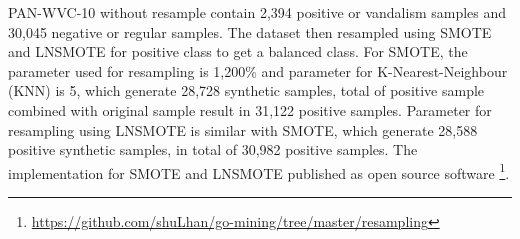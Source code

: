 PAN-WVC-10 without resample contain 2,394 positive or vandalism samples and
30,045 negative or regular samples.
The dataset then resampled using SMOTE and LNSMOTE for
positive class to get a balanced class.
For SMOTE, the parameter used for resampling is 1,200\% and parameter for
K-Nearest-Neighbour (KNN) is 5, which generate 28,728 synthetic samples, total of
positive sample combined with original sample result in 31,122 positive
samples.
Parameter for resampling using LNSMOTE is similar with SMOTE, which generate
28,588 positive synthetic samples, in total of 30,982 positive samples.
The implementation for SMOTE and LNSMOTE published as open source software
\footnote{\url{https://github.com/shuLhan/go-mining/tree/master/resampling}}.
